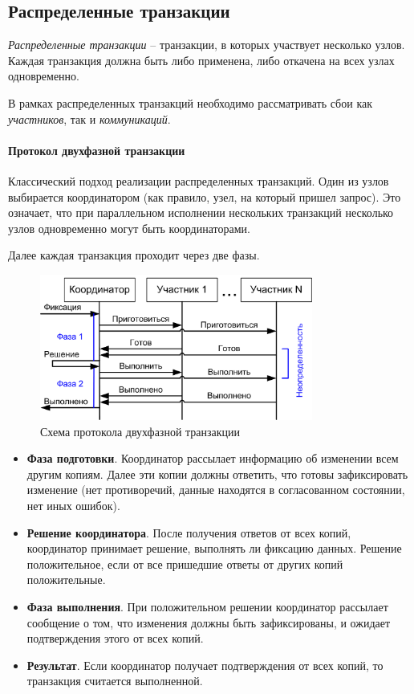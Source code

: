 \subsection{Распределенные транзакции}

\begin{definition}
	\textit{Распределенные транзакции} -- транзакции, в которых участвует несколько узлов. Каждая
	транзакция должна быть либо применена, либо откачена на всех узлах одновременно.
\end{definition}

В рамках распределенных транзакций необходимо рассматривать сбои как \textit{участников}, так и
\textit{коммуникаций}.

\paragraph{Протокол двухфазной транзакции}

Классический подход реализации распределенных транзакций. Один из узлов выбирается координатором
(как правило, узел, на который пришел запрос). Это означает, что при параллельном исполнении
нескольких транзакций несколько узлов одновременно могут быть координаторами.

Далее каждая транзакция проходит через две фазы.

\begin{figure}[h]
	\centering
	\includegraphics[width=0.8\textwidth]{../assets/kgeorgiy/distributed/Distributed_TwoPhase.png}
	\caption{Схема протокола двухфазной транзакции}
	\label{2-phase-tx}
\end{figure}

\begin{itemize}
	\item \textbf{Фаза подготовки}. Координатор рассылает информацию об изменении всем другим
	      копиям. Далее эти копии должны ответить, что готовы зафиксировать изменение (нет противоречий,
	      данные находятся в согласованном состоянии, нет иных ошибок).
	\item \textbf{Решение координатора}. После получения ответов от всех копий, координатор
	      принимает решение, выполнять ли фиксацию данных. Решение положительное, если от все пришедшие
	      ответы от других копий положительные.
	\item \textbf{Фаза выполнения}. При положительном решении координатор рассылает сообщение о
	      том, что изменения должны быть зафиксированы, и ожидает подтверждения этого от всех копий.
	\item \textbf{Результат}. Если координатор получает подтверждения от всех копий, то транзакция
	      считается выполненной.
\end{itemize}

